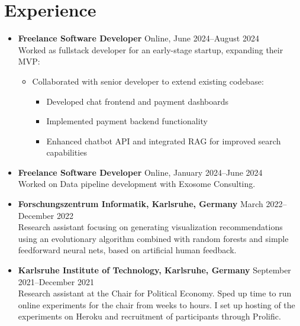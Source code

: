 \documentclass[letterpaper,10pt]{article}
\begin{document}
\section*{Experience}
\begin{itemize}
    \item \textbf{Freelance Software Developer} \hfill Online, June 2024--August 2024 \\
        Worked as fullstack developer for an early-stage startup, expanding their MVP:
        \begin{itemize}
            \item Collaborated with senior developer to extend existing codebase:
			\begin{itemize}
				\item Developed chat frontend and payment dashboards
				\item Implemented payment backend functionality
				\item Enhanced chatbot API and integrated RAG for improved search capabilities
			\end{itemize}
        \end{itemize}
    \item \textbf{Freelance Software Developer} \hfill Online, January 2024--June 2024 \\
        Worked on Data pipeline development with Exosome Consulting.
    \item \textbf{Forschungszentrum Informatik, Karlsruhe, Germany} \hfill March 2022--December 2022 \\
          Research assistant focusing on generating visualization recommendations using an
          evolutionary algorithm combined with random forests and simple feedforward neural nets,
          based on artificial human feedback.
    \item \textbf{Karlsruhe Institute of Technology, Karlsruhe, Germany} \hfill September 2021--December 2021 \\
          Research assistant at the Chair for Political Economy. Sped up time to run online experiments for the chair from
          weeks to hours. I set up hosting of the experiments on Heroku and recruitment of participants through Prolific.
\end{itemize}
\end{document}
